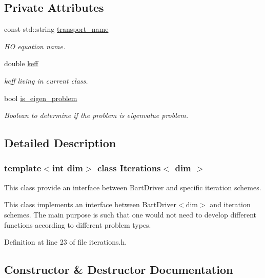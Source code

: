 \subsection*{Private Attributes}
\begin{DoxyCompactItemize}
\item 
const std\+::string \hyperlink{class_iterations_a3a29339b09351ffa95e9c99be5d5e575}{transport\+\_\+name}
\begin{DoxyCompactList}\small\item\em HO equation name. \end{DoxyCompactList}\item 
double \hyperlink{class_iterations_a4c36c8bdd6775be8015ef113c68a1e66}{keff}
\begin{DoxyCompactList}\small\item\em keff living in current class. \end{DoxyCompactList}\item 
bool \hyperlink{class_iterations_acfd49ecddab96b70fc271942b3173ad7}{is\+\_\+eigen\+\_\+problem}
\begin{DoxyCompactList}\small\item\em Boolean to determine if the problem is eigenvalue problem. \end{DoxyCompactList}\end{DoxyCompactItemize}


\subsection{Detailed Description}
\subsubsection*{template$<$int dim$>$\newline
class Iterations$<$ dim $>$}

This class provide an interface between Bart\+Driver and specific iteration schemes. 

This class implements an interface between Bart\+Driver$<$dim$>$ and iteration schemes. The main purpose is such that one would not need to develop different functions according to different problem types. 

Definition at line 23 of file iterations.\+h.



\subsection{Constructor \& Destructor Documentation}
\mbox{\label{class_iterations_a0355678383cd174840beb772ce7e9e8d}} 
